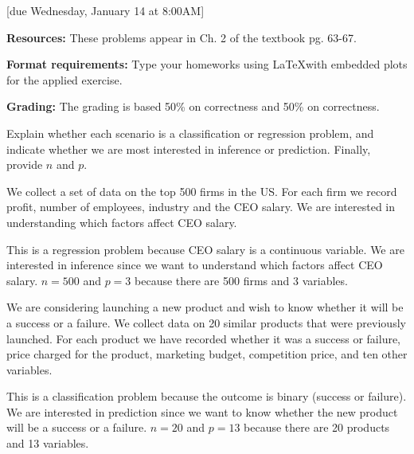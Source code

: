 \documentclass{article}
\begin{document}
[due Wednesday, January 14 at 8:00AM]

\textbf{Resources:} These problems appear in Ch. 2 of the textbook pg. 63-67.

\textbf{Format requirements:} Type your homeworks using \LaTeX with embedded plots for the applied exercise.

\textbf{Grading:} The grading is based 50\% on correctness and 50\% on correctness.

\vspace{1em}

\begin{probset}

\begin{prob}
    Explain whether each scenario is a classification or regression problem, and indicate whether we are most interested in inference or prediction. Finally, provide $n$ and $p$.

    \begin{subprobset}
        \begin{subprob}
            We collect a set of data on the top 500 firms in the US. For each firm we record profit, number of employees, industry and the CEO salary. We are interested in understanding which factors affect CEO salary.

            \begin{soln}
                This is a regression problem because CEO salary is a continuous variable. We are interested in inference since we want to understand which factors affect CEO salary. $n = 500$ and $p = 3$ because there are 500 firms and 3 variables.
            \end{soln}
        \end{subprob}

        \begin{subprob}
            We are considering launching a new product and wish to know whether it will be a success or a failure. We collect data on 20 similar products that were previously launched. For each product we have recorded whether it was a success or failure, price charged for the product, marketing budget, competition price, and ten other variables.

            \begin{soln}
                This is a classification problem because the outcome is binary (success or failure). We are interested in prediction since we want to know whether the new product will be a success or a failure. $n = 20$ and $p = 13$ because there are 20 products and 13 variables.
            \end{soln}
        \end{subprob}
        

\end{subprobset}
\end{prob}
\end{probset}
\end{document}
